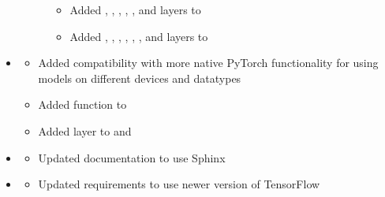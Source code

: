 \documentclass[letterpaper,10pt,english]{sphinxmanual}
\begin{document}
\begin{itemize}
\begin{description}
\begin{itemize}
\item {} 
\sphinxAtStartPar
Added , , , , , and  layers to 

\item {} 
\sphinxAtStartPar
Added , , , , , , and  layers to 

\end{itemize}

\end{description}

\item {} \begin{description}
\begin{itemize}
\item {} 
\sphinxAtStartPar
Added  compatibility with more native PyTorch functionality for using models on different devices and datatypes

\item {} 
\sphinxAtStartPar
Added  function to 

\item {} 
\sphinxAtStartPar
Added  layer to  and 

\end{itemize}

\end{description}

\item {} \begin{description}
\begin{itemize}
\item {} 
\sphinxAtStartPar
Updated documentation to use Sphinx

\end{itemize}

\end{description}

\item {} \begin{description}
\begin{itemize}
\item {} 
\sphinxAtStartPar
Updated requirements to use newer version of TensorFlow


\end{itemize}
\end{description}
\end{itemize}
\end{document}
